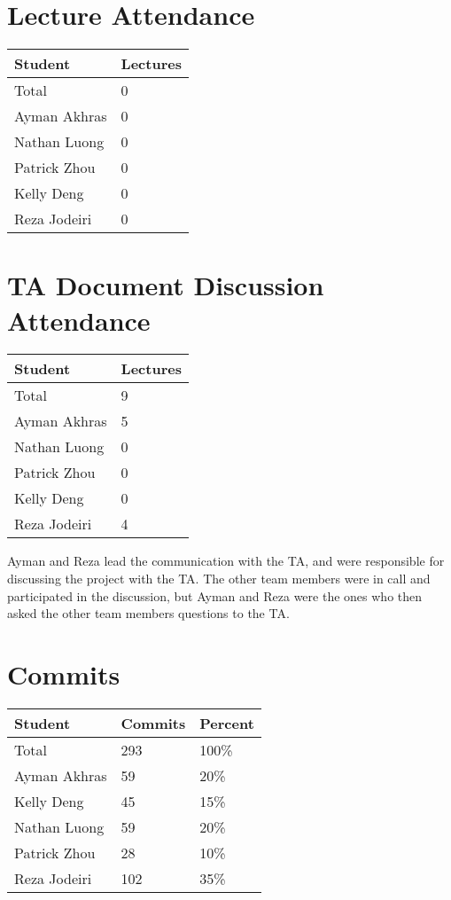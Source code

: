 \documentclass{article}
\begin{document}
\section{Lecture Attendance}

\begin{table}[H]
\centering
\begin{tabular}{ll}
\toprule
\textbf{Student} & \textbf{Lectures}\\
\midrule
Total & 0\\
Ayman Akhras & 0\\
Nathan Luong & 0\\
Patrick Zhou & 0\\
Kelly Deng & 0\\
Reza Jodeiri & 0\\
\bottomrule
\end{tabular}
\end{table}

\section{TA Document Discussion Attendance}

\begin{table}[H]
\centering
\begin{tabular}{ll}
\toprule
\textbf{Student} & \textbf{Lectures}\\
\midrule
Total & 9\\
Ayman Akhras & 5\\
Nathan Luong & 0\\
Patrick Zhou & 0\\
Kelly Deng & 0\\
Reza Jodeiri & 4\\
\bottomrule
\end{tabular}
\end{table}

Ayman and Reza lead the communication with the TA, and were responsible for discussing the project with the TA. The other team members were in call and participated in the discussion, but Ayman and Reza were the ones who then asked the other team members questions to the TA.
\section{Commits}

\begin{table}[H]
\centering
\begin{tabular}{lll}
\toprule
\textbf{Student} & \textbf{Commits} & \textbf{Percent}\\
\midrule
Total & 293 & 100\% \\
Ayman Akhras & 59 & 20\%\\
Kelly Deng & 45 & 15\%\\
Nathan Luong & 59 & 20\%\\
Patrick Zhou & 28 & 10\%\\
Reza Jodeiri & 102 & 35\%\\
\bottomrule
\end{tabular}
\end{table}
\end{document}
